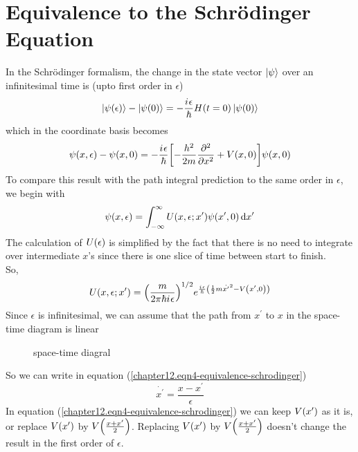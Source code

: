 	\section{Equivalence to the Schr\"{o}dinger Equation}
	In the Schr\"{o}dinger formalism, the change in the state vector $\ket{\psi}$ over an infinitesimal time is (upto first order in $\epsilon$)
	\begin{equation}
		\ket{\psi\qty(\epsilon)} - 		\ket{\psi\qty(0)} = - \frac{{i\mkern1mu} \epsilon}{\hbar} H\qty(t=0)\ket{\psi\qty(0)}
		\label{chapter12.eqn1-equivalence-schrodinger}
	\end{equation}
	which in the coordinate basis becomes
	\begin{equation}
		\psi\qty(x, \epsilon) - \psi\qty(x, 0) = - \frac{{i\mkern1mu} \epsilon}{\hbar}\qty[-\frac{h^2}{2 m}\pdv[2]{x} + V\qty(x, 0)] \psi\qty(x, 0)
		\label{chapter12.eqn2-equivalence-schrodinger}
	\end{equation}
	To compare this result with the path integral prediction to the same order in $\epsilon$, we begin with
	\begin{equation}
		\psi\qty(x, \epsilon) = \int_{-\infty}^{\infty} U(x, \epsilon; x^\prime) \psi\qty(x^\prime, 0) \dd{x^\prime}
		\label{chapter12.eqn3-equivalence-schrodinger}
	\end{equation}
	The calculation of $U\qty(\epsilon)$ is simplified by the fact that there is no need to integrate over intermediate $x$'s since there is one slice of time between start to finish.\\
	
	So,
	\begin{equation}
		U\qty(x, \epsilon; x^\prime) = \qty(\frac{m}{2\pi \hbar {i\mkern1mu} \epsilon})^{1/2} e^{\frac{{i\mkern1mu} \epsilon}{\hbar}\qty(\frac{1}{2} m \dot{x^\prime}^2 - V\qty(x^\prime, 0))}
		\label{chapter12.eqn4-equivalence-schrodinger}
	\end{equation}
	Since $\epsilon$ is infinitesimal, we can assume that the path from $x^\prime$ to $x$ in the space-time diagram is linear
	
	
	\begin{figure}
		\caption{space-time diagral}
	\end{figure}
	So we can write in equation (\ref{chapter12.eqn4-equivalence-schrodinger})
	\begin{equation}
		\dot{x^\prime} = \frac{x-x^\prime}{\epsilon}
	\end{equation}
	In equation (\ref{chapter12.eqn4-equivalence-schrodinger}) we can keep $V\qty(x^\prime)$ as it is, or replace $V\qty(x^\prime)$ by $V\qty(\frac{x + x^\prime}{2})$. Replacing $V\qty(x^\prime)$ by $V\qty(\frac{x + x^\prime}{2})$ doesn't change the result in the first order of $\epsilon$.
	
